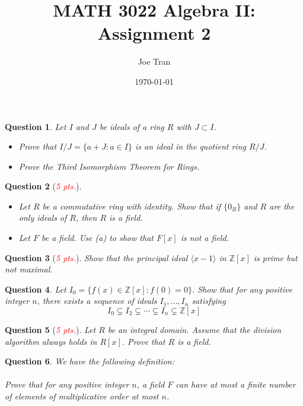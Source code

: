 \documentclass[11pt]{amsart}
\title{MATH 3022 Algebra II: Assignment 2}
\author{Joe Tran}
\date{\today}
\newtheorem{question}{Question}
\theoremstyle{definition}\newtheorem{solution}{Solution}
\theoremstyle{definition}\newtheorem{definition}{Definition}
\newcommand{\Z}{\mathbb{Z}}
\begin{document}
\maketitle

\begin{question}
    Let $I$ and $J$ be ideals of a ring $R$ with $J \subset I$.
    \begin{itemize}
        \item[(a)] Prove that $I/J = \{a + J : a \in I\}$ is an ideal in the quotient ring $R/J$.
        \item[(b)] Prove the Third Isomorphism Theorem for Rings.
    \end{itemize}
\end{question}

\begin{question}[\textcolor{red}{\emph{5 pts.}}]
    \begin{itemize}
        \item[(a)] Let $R$ be a commutative ring with identity. Show that if $\{0_R\}$ and $R$ are the only ideals of $R$, then $R$ is a field.
        \item[(b)] Let $F$ be a field. Use (a) to show that $F[x]$ is not a field.
    \end{itemize}
\end{question}

\begin{question}[\textcolor{red}{\emph{5 pts.}}]
    Show that the principal ideal $\langle{x - 1}\rangle$ in $\Z[x]$ is prime but not maximal.
\end{question}

\begin{question}
    Let $I_0 = \{f(x) \in \Z[x] : f(0) = 0\}$. Show that for any positive integer $n$, there exists a sequence of ideals $I_1,..., I_n$ satisfying
    \begin{equation*}
        I_0 \subsetneq I_2 \subsetneq \cdots \subsetneq I_n \subsetneq \Z[x]
    \end{equation*}
\end{question}

\begin{question}[\textcolor{red}{\emph{5 pts.}}]
    Let $R$ be an integral domain. Assume that the division algorithm always holds in $R[x]$. Prove that $R$ is a field.
\end{question}

\begin{question}
    We have the following definition: \\[0.5em]
    \\[0.5em]
    Prove that for any positive integer $n$, a field $F$ can have at most a finite number of elements of multiplicative order at most $n$.
\end{question}
\end{document}

